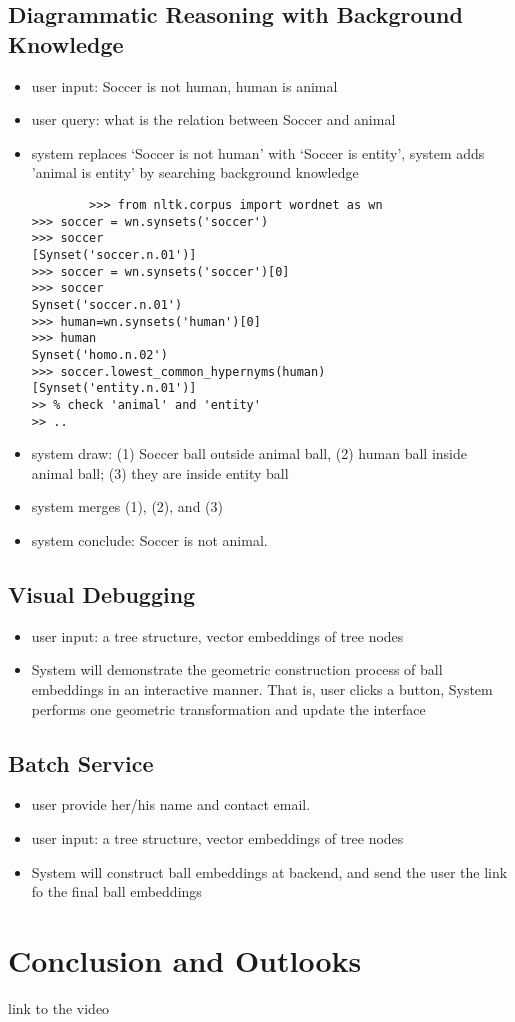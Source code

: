 \documentclass[runningheads]{llncs}
\begin{document}
\subsection{Diagrammatic Reasoning with Background Knowledge} 
\begin{itemize}
	\item user input: Soccer is not human, human is animal
	\item  user query: what is the relation between Soccer and animal
	\item  system replaces `Soccer is not human' with `Soccer is entity', system adds 'animal is entity' by searching background knowledge
	\begin{verbatim}
		>>> from nltk.corpus import wordnet as wn
>>> soccer = wn.synsets('soccer')
>>> soccer
[Synset('soccer.n.01')]
>>> soccer = wn.synsets('soccer')[0]
>>> soccer
Synset('soccer.n.01')
>>> human=wn.synsets('human')[0]
>>> human
Synset('homo.n.02') 
>>> soccer.lowest_common_hypernyms(human)
[Synset('entity.n.01')] 
>> % check 'animal' and 'entity'
>> ..
	\end{verbatim}
\item  system draw: (1) Soccer ball outside animal ball, (2) human ball inside animal ball; (3) they are inside entity ball 
	\item system merges (1), (2), and (3)  
	\item system conclude: Soccer is not animal.
\end{itemize}

\subsection{Visual Debugging}

\begin{itemize}
	\item user input: a tree structure, vector embeddings of tree nodes
	\item System will demonstrate the geometric construction process of ball embeddings in an interactive manner. That is, user clicks a button, System performs one geometric transformation and update the interface 
\end{itemize}

\subsection{Batch Service}

\begin{itemize}
	\item user provide her/his name and contact email.
	\item user input: a tree structure, vector embeddings of tree nodes
	\item System will construct ball embeddings at backend, and send the user the link fo the final ball embeddings  
\end{itemize}

\section{Conclusion and Outlooks}

link to the video

 
%
%
%
% 
% 
% 
\end{document}

